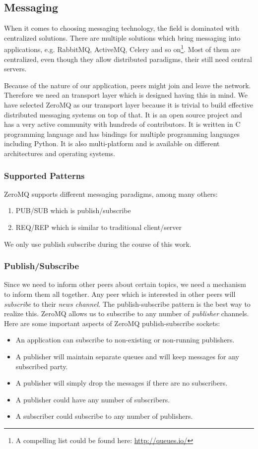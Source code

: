 \subsection{Messaging}
When it comes to choosing messaging technology, the field is dominated with centralized solutions.
There are multiple solutions which bring messaging into applications, 
e.g. RabbitMQ, ActiveMQ, Celery and so on\footnote{A compelling list could be found here: \url{http://queues.io/}}.
Most of them are centralized, even though they allow
distributed paradigms, their still need central servers.

Because of the nature of our application, peers might join and leave the network.
Therefore we need an transport layer which is designed having this in mind. 
We have selected ZeroMQ as our transport layer 
because it is trivial to build effective distributed messaging systems on top of that.
It is an open source project and has a very active community with hundreds of contributors. 
It is written in C programming language and has bindings for multiple programming languages including Python.
It is also multi-platform and is available on different architectures and operating systems.

\subsubsection{Supported Patterns}
ZeroMQ supports different messaging paradigms, among many others:
\begin{enumerate}
\item PUB/SUB which is publish/subscribe
\item REQ/REP which is similar to traditional client/server
\end{enumerate}
We only use publish subscribe during the course of this work.

\subsubsection{Publish/Subscribe}
Since we need to inform other peers about certain topics, we need a mechanism to inform them all together.
Any peer which is interested in other peers will \textit{subscribe} to their \textit{news channel}. 
The publish-subscribe pattern is the best way to realize this. 
ZeroMQ allows us to subscribe to any number of \textit{publisher} channels. 
Here are some important aspects of ZeroMQ publish-subscribe sockets:
\begin{itemize}
\item An application can subscribe to non-existing or non-running publishers.
\item A publisher will maintain separate queues and will keep messages for any subscribed party.
\item A publisher will simply drop the messages if there are no subscribers.
\item A publisher could have any number of subscribers.
\item A subscriber could subscribe to any number of publishers.
\end{itemize}


